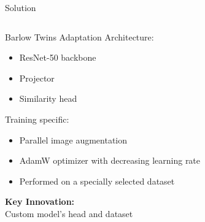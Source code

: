 \documentclass{beamer}
\begin{document}
\begin{frame}{Solution}
\begin{columns}
    \begin{block}{Barlow Twins Adaptation}
        \vspace{3mm}
        Architecture:
        \begin{itemize}
            \item ResNet-50 backbone
            \item Projector
            \item Similarity head
        \end{itemize}
        Training specific:
        \begin{itemize}
            \item Parallel image augmentation
            \item AdamW optimizer with decreasing learning rate
            \item Performed on a specially selected dataset
        \end{itemize}
        
        \vspace{2mm}
        \textbf{Key Innovation:} \\
        Custom model's head and dataset \\
    \end{block}
    

\end{columns}
\end{frame}
\end{document}

